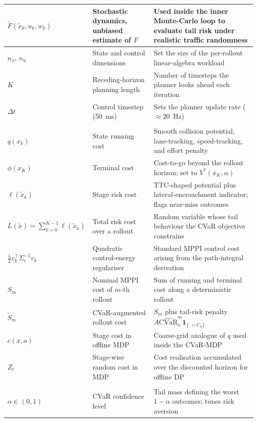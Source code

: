 \documentclass[letterpaper, 10 pt, conference]{ieeeconf}  %
\begin{document}
\begin{longtable}{|>{\raggedright\arraybackslash}p{}|>{\raggedright\arraybackslash}p{}|>{\raggedright\arraybackslash}p{}|}
\hline
$\tilde{F}(\tilde{x}_k,u_k,w_k)$ & Stochastic dynamics, unbiased estimate of $F$ & Used inside the inner Monte-Carlo loop to evaluate tail risk under realistic traffic randomness \\
\hline
$n_x,\,n_u$ & State and control dimensions & Set the size of the per-rollout linear-algebra workload \\
\hline
$K$ & Receding-horizon planning length & Number of timesteps the planner looks ahead each iteration \\
\hline
$\Delta t$ & Control timestep ($50$~ms) & Sets the planner update rate ($\approx\!20$~Hz) \\
\hline
\multicolumn{3}{|l|}{\textit{Costs and penalties}} \\
\hline
$q(x_k)$ & State running cost & Smooth collision potential, lane-tracking, speed-tracking, and effort penalty \\
\hline
$\phi(x_K)$ & Terminal cost & Cost-to-go beyond the rollout horizon; set to $V^{*}(x_K,\alpha)$ \\
\hline
$\ell(\tilde{x}_k)$ & Stage risk cost & TTC-shaped potential plus lateral-encroachment indicator; flags near-miss outcomes \\
\hline
$L(\tilde{x})\!=\!\sum_{k=0}^{K-1}\ell(\tilde{x}_k)$ & Total risk cost over a rollout & Random variable whose tail behaviour the CVaR objective constrains \\
\hline
$\tfrac{\lambda}{2}v_k^{\!\top}\Sigma_\epsilon^{-1}v_k$ & Quadratic control-energy regulariser & Standard MPPI control cost arising from the path-integral derivation \\
\hline
$S_m$ & Nominal MPPI cost of $m$-th rollout & Sum of running and terminal cost along a deterministic rollout \\
\hline
$\tilde{S}_m$ & CVaR-augmented rollout cost & $S_m$ plus tail-risk penalty $A\widehat{\mathrm{CVaR}}_\alpha^{m}\mathbf{1}_{\{\cdot>C_u\}}$ \\
\hline
$c(x,a)$ & Stage cost in offline MDP & Coarse-grid analogue of $q$ used inside the CVaR-MDP \\
\hline
$Z_t$ & Stage-wise random cost in MDP & Cost realisation accumulated over the discounted horizon for offline DP \\
\hline
\multicolumn{3}{|l|}{\textit{CVaR and risk quantities}} \\
\hline
$\alpha\!\in\!(0,1)$ & CVaR confidence level & Tail mass defining the worst $1\!-\!\alpha$ outcomes; tunes risk aversion \\

\end{longtable}
\end{document}
